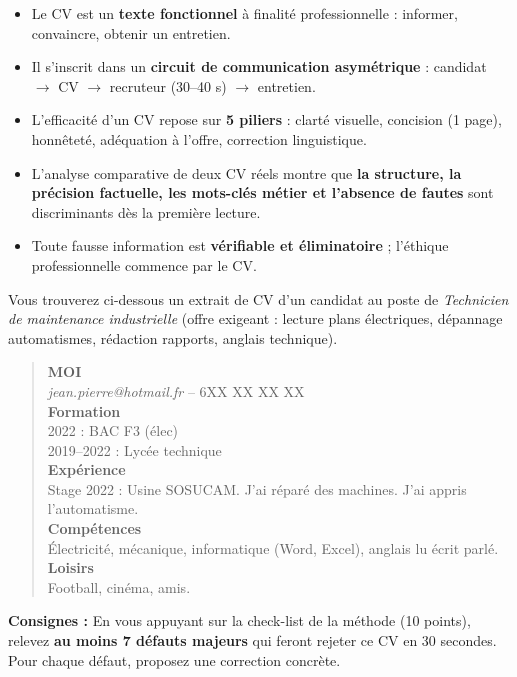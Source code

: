 \documentclass[11pt]{article}
\newcounter{popsec}
\newcounter{popsub}
\newcommand{\courssub}[1]{%
  \stepcounter{popsub}%
  \par\vspace{9pt}\noindent{\popxbold\fontsize{11.5}{13}\selectfont\color{popink}{\color{poporange}\thepopsec.\thepopsub}\hspace{6pt}#1}\par\nopagebreak\vspace{4pt}
}
\begin{document}
\courssub{Synthèse de la découverte}

\begin{aretenir}
\begin{itemize}
    \item Le CV est un \textbf{texte fonctionnel} à finalité professionnelle : informer, convaincre, obtenir un entretien.
    \item Il s'inscrit dans un \textbf{circuit de communication asymétrique} : candidat $\rightarrow$ CV $\rightarrow$ recruteur (30--40 s) $\rightarrow$ entretien.
    \item L'efficacité d'un CV repose sur \textbf{5 piliers} : clarté visuelle, concision (1 page), honnêteté, adéquation à l'offre, correction linguistique.
    \item L'analyse comparative de deux CV réels montre que \textbf{la structure, la précision factuelle, les mots-clés métier et l'absence de fautes} sont discriminants dès la première lecture.
    \item Toute fausse information est \textbf{vérifiable et éliminatoire} ; l'éthique professionnelle commence par le CV.
\end{itemize}
\end{aretenir}

\begin{exercice}
Vous trouverez ci-dessous un extrait de CV d'un candidat au poste de \textit{Technicien de maintenance industrielle} (offre exigeant : lecture plans électriques, dépannage automatismes, rédaction rapports, anglais technique).

\begin{quote}
\textbf{MOI} \\
\textit{jean.pierre@hotmail.fr} -- 6XX XX XX XX \\
\textbf{Formation} \\
2022 : BAC F3 (élec) \\
2019--2022 : Lycée technique \\
\textbf{Expérience} \\
Stage 2022 : Usine SOSUCAM. J'ai réparé des machines. J'ai appris l'automatisme. \\
\textbf{Compétences} \\
Électricité, mécanique, informatique (Word, Excel), anglais lu écrit parlé. \\
\textbf{Loisirs} \\
Football, cinéma, amis.
\end{quote}

\textbf{Consignes :} En vous appuyant sur la check-list de la méthode (10 points), relevez \textbf{au moins 7 défauts majeurs} qui feront rejeter ce CV en 30 secondes. Pour chaque défaut, proposez une correction concrète.
\end{exercice}
\end{document}
